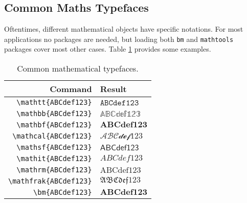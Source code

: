 \subsection{Common Maths Typefaces}
%
Oftentimes, different mathematical objects have specific notations.
For most applications no packages are needed, but loading both
\verb|bm| and \verb|mathtools| packages cover most other cases.  Table
\ref{t:mt} provides some examples.
\begin{table}[!htbp]
    \centering
    \caption{Common mathematical typefaces.}
    \label{t:mt}
    \begin{tabular}{rl}
        \toprule
        Command & Result \\
        \midrule
        \verb|\mathtt{ABCdef123}| & $\mathtt{ABCdef123}$ \\
        \verb|\mathbb{ABCdef123}| & $\mathbb{ABCdef123}$ \\
        \verb|\mathbf{ABCdef123}| & $\mathbf{ABCdef123}$ \\
        \verb|\mathcal{ABCdef123}| & $\mathcal{ABCdef123}$ \\
        \verb|\mathsf{ABCdef123}| & $\mathsf{ABCdef123}$ \\
        \verb|\mathit{ABCdef123}| & $\mathit{ABCdef123}$ \\
        \verb|\mathrm{ABCdef123}| & $\mathrm{ABCdef123}$ \\
        \verb|\mathfrak{ABCdef123}| & $\mathfrak{ABCdef123}$ \\
        \verb|\bm{ABCdef123}| & $\bm{ABCdef123}$ \\
        \bottomrule
    \end{tabular}
\end{table}
%
